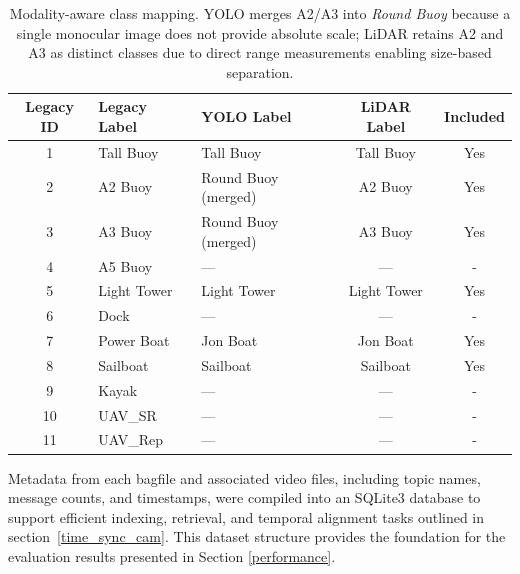 \documentclass[../main.tex]{subfiles}
\begin{document}
\begin{table}[ht]
\centering
\begin{tabular}{cllcc}
\hline
Legacy ID & Legacy Label & YOLO Label & LiDAR Label  & Included \\
\hline
1  & Tall Buoy          & Tall Buoy              & Tall Buoy          & Yes \\
2  & A2 Buoy            & Round Buoy (merged)    & A2 Buoy            & Yes \\
3  & A3 Buoy            & Round Buoy (merged)    & A3 Buoy            & Yes \\
4  & A5  Buoy           & —                      & —                  & - \\
5  & Light Tower        & Light Tower            & Light Tower        & Yes \\
6  & Dock               & —                      & —                  & - \\
7  & Power Boat         & Jon Boat               & Jon Boat           & Yes \\
8  & Sailboat           & Sailboat               & Sailboat           & Yes \\
9  & Kayak              & —                      & —                  & - \\
10 & UAV\_SR    & —                      & —                  & - \\
11 & UAV\_Rep   & —                      & —                  & - \\
\hline
\end{tabular}
\caption{Modality-aware class mapping. YOLO merges A2/A3 into \emph{Round Buoy} because a single monocular image does not provide absolute scale; LiDAR retains A2 and A3 as distinct classes due to direct range measurements enabling size-based separation.}
\label{tab:class_map}
\end{table}

Metadata from each bagfile and associated video files, including topic names, message counts, and timestamps, were compiled into an SQLite3 database to support efficient indexing, retrieval, and temporal alignment tasks outlined in section~\ref{time_sync_cam}.
This dataset structure provides the foundation for the evaluation results presented in Section \ref{performance}. 

\end{document}
